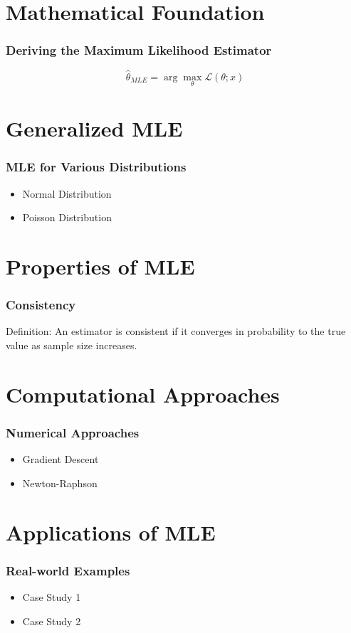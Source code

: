 \documentclass{beamer}
\begin{document}
\section{Mathematical Foundation}
\begin{frame}
\frametitle{Deriving the Maximum Likelihood Estimator}
\begin{equation}
\hat{\theta}_{MLE} = \arg \max_{\theta} \mathcal{L}(\theta; x)
\end{equation}
\end{frame}

\section{Generalized MLE}
\begin{frame}
\frametitle{MLE for Various Distributions}
\begin{itemize}
    \item Normal Distribution
    \item Poisson Distribution
\end{itemize}
\end{frame}

\section{Properties of MLE}
\begin{frame}
\frametitle{Consistency}
Definition: An estimator is consistent if it converges in probability to the true value as sample size increases.
\end{frame}

\section{Computational Approaches}
\begin{frame}
\frametitle{Numerical Approaches}
\begin{itemize}
    \item Gradient Descent
    \item Newton-Raphson
\end{itemize}
\end{frame}

\section{Applications of MLE}
\begin{frame}
\frametitle{Real-world Examples}
\begin{itemize}
    \item Case Study 1
    \item Case Study 2
\end{itemize}
\end{frame}
\end{document}
